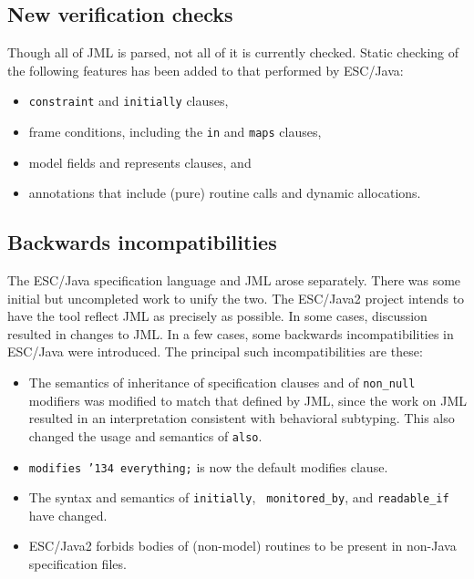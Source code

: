 \documentclass{acm_proc_article-sp}
\begin{document}
\subsection{New verification checks}
Though all of JML is parsed, not all of it is currently checked.
Static checking of the following features has been added to that performed by
ESC/Java: 
\setlength{\partopsep}{0in}\setlength{\parskip}{0in}\setlength{\itemsep}{0in}\setlength{\topsep}{0in}
\begin{itemize}
\setlength{\partopsep}{0in}\setlength{\parskip}{0in}\setlength{\itemsep}{0in}\setlength{\topsep}{0in}
\item \texttt{constraint} and \texttt{initially} clauses,
\item frame conditions, including the \texttt{in} and \texttt{maps} clauses,
\item model fields and represents clauses, and
\item annotations that include (pure) routine calls and dynamic allocations.
\end{itemize}

\subsection{Backwards incompatibilities}
The ESC/Java specification language and JML arose separately.  There
was some initial but uncompleted work to unify the two.  The ESC/Java2
project intends to have the tool reflect JML as precisely as possible.
In some cases, discussion resulted in changes to JML.  In
a few cases, some backwards incompatibilities in ESC/Java were
introduced.  The principal such incompatibilities are these:
\setlength{\partopsep}{0in}\setlength{\parskip}{0in}\setlength{\itemsep}{0in}\setlength{\topsep}{0in}
\begin{itemize}
\setlength{\partopsep}{0in}\setlength{\parskip}{0in}\setlength{\itemsep}{0in}\setlength{\topsep}{0in}
\item The semantics of inheritance of specification clauses and of
  \texttt{non\_null} modifiers was modified to match that defined by JML, since
  the work on JML resulted in an interpretation consistent with
  behavioral subtyping.  This also changed the usage and semantics of \texttt{also}.
\item \texttt{modifies \char'134 everything;} is now the default modifies clause.
\item The syntax and semantics of \texttt{initially}, {\tt
    monitored\_by}, and \texttt{readable\_if} have changed.
\item ESC/Java2 
  forbids bodies of (non-model) routines to be present in non-Java
  specification files.
\end{itemize}
\end{document}
